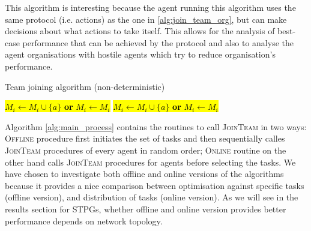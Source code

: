 \documentclass{llncs}
\begin{document}
This algorithm is interesting because the agent running this algorithm uses the same protocol (i.e. actions) as the one in \ref{alg:join_team_org}, but can make decisions about what actions to take itself. This allows for the analysis of best-case performance that can be achieved by the protocol and also to analyse the agent organisations with hostile agents which try to reduce organisation's performance.

\begin{algorithm}[H]
\caption{Team joining algorithm (non-deterministic)}
\label{alg:join_team_nondet}
\begin{scriptsize}
\begin{algorithmic}
     
       
	 
	    \State \hl{$M_i \leftarrow M_i \cup \{a\}$  \textbf{or} $M_i \leftarrow M_i$} 
	\EndIf
       
	 
	  \State \hl{$M_i \leftarrow M_i \cup \{a\}$ \textbf{or} $M_i \leftarrow M_i$} 
	\EndIf
      \EndIf
    \EndIf
  \EndFor
\EndProcedure
\end{algorithmic}
\end{scriptsize}
\end{algorithm}

Algorithm \ref{alg:main_process} contains the routines to call \textsc{JoinTeam} in two ways: \textsc{Offline} procedure first initiates the set of tasks and then sequentially calles \textsc{JoinTeam} procedures of every agent in random order; \textsc{Online} routine on the other hand calls \textsc{JoinTeam} procedures for agents before selecting the tasks. We have chosen to investigate both offline and online versions of the algorithms because it provides a nice comparison between optimisation against specific tasks (offline version), and distribution of tasks (online version). As we will see in the results section for STPGs, whether offline and online version provides better performance depends on network topology.
\end{document}
